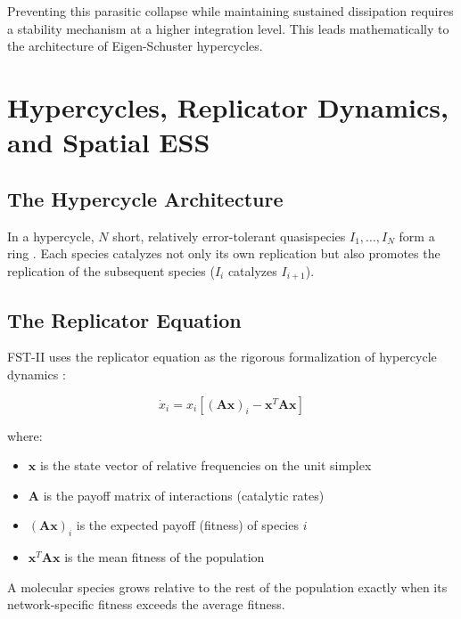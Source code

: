 \documentclass[12pt,a4paper]{article}
\theoremstyle{remark}
\begin{document}
Preventing this parasitic collapse while maintaining sustained dissipation requires a stability mechanism at a higher integration level. This leads mathematically to the architecture of Eigen-Schuster hypercycles.

\section{Hypercycles, Replicator Dynamics, and Spatial ESS}
\label{sec:hypercycles}

\subsection{The Hypercycle Architecture}

In a hypercycle, $N$ short, relatively error-tolerant quasispecies $I_1, \ldots, I_N$ form a ring \citep{Eigen1979}. Each species catalyzes not only its own replication but also promotes the replication of the subsequent species ($I_i$ catalyzes $I_{i+1}$).

\subsection{The Replicator Equation}

FST-II uses the replicator equation as the rigorous formalization of hypercycle dynamics \citep{ReplicatorEntropy,ReplicatorDiffusion}:

\begin{equation}
\dot{x}_i = x_i \left[ (\mathbf{A}\mathbf{x})_i - \mathbf{x}^T \mathbf{A} \mathbf{x} \right]
\end{equation}

where:
\begin{itemize}
    \item $\mathbf{x}$ is the state vector of relative frequencies on the unit simplex
    \item $\mathbf{A}$ is the payoff matrix of interactions (catalytic rates)
    \item $(\mathbf{A}\mathbf{x})_i$ is the expected payoff (fitness) of species $i$
    \item $\mathbf{x}^T \mathbf{A} \mathbf{x}$ is the mean fitness of the population
\end{itemize}

A molecular species grows relative to the rest of the population exactly when its network-specific fitness exceeds the average fitness.
\end{document}
